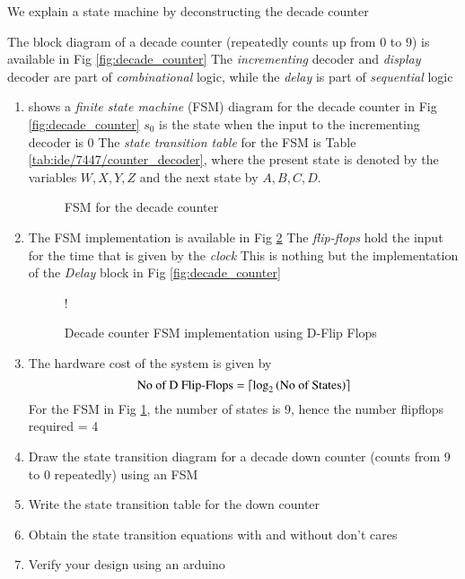 We explain  a state machine by deconstructing the decade counter

The block diagram of a decade counter (repeatedly counts up from 0 to 9)
is available in Fig \ref{fig:decade_counter}  The {\em incrementing } decoder
and {\em display} decoder are part of {\em combinational} logic, while
the {\em delay} is part of {\em sequential} logic
%
%
\begin{enumerate}[label=\arabic*.,ref=\theenumi]
%
\item {} shows a {\em finite state machine} (FSM) diagram for the decade counter in Fig \ref{fig:decade_counter}  $s_0$ is the state when the input to the incrementing decoder is 0  The {\em state transition table} for the FSM is Table \ref{tab:ide/7447/counter_decoder},
		where the present state is denoted by the variables $W,X,Y,Z$ and the next state by $A,B,C,D$.  
\begin{figure}[H]
\centering

\caption{FSM for the decade counter}
\label{fig:fsm_counter}
\end{figure}
\item The FSM implementation is available in Fig \ref{fig:dff}  The {\em flip-flops} hold the input for the time that is given by the {\em clock}  This is nothing but the implementation of the {\em Delay} block in Fig \ref{fig:decade_counter}
%
\begin{figure}[H]
\resizebox {\columnwidth} {!} {

}
\caption{Decade counter FSM implementation using D-Flip Flops}
\label{fig:dff}
\end{figure}
%
\item The hardware cost of the system is given by
\begin{equation}
\text{No of D Flip-Flops} = \left \lceil \log_{2}\left(\text{No of States}\right) \right \rceil
\end{equation}
For the FSM in Fig \ref{fig:fsm_counter}, the number of states is 9, hence the number flipflops required = 4  
\item Draw the state transition diagram for 
a decade down counter (counts from 9 to 0 repeatedly) using an FSM  
\item Write the state transition table for the down counter
\item Obtain the state transition equations with and without don't cares
\item Verify your design using an arduino
\end{enumerate}



